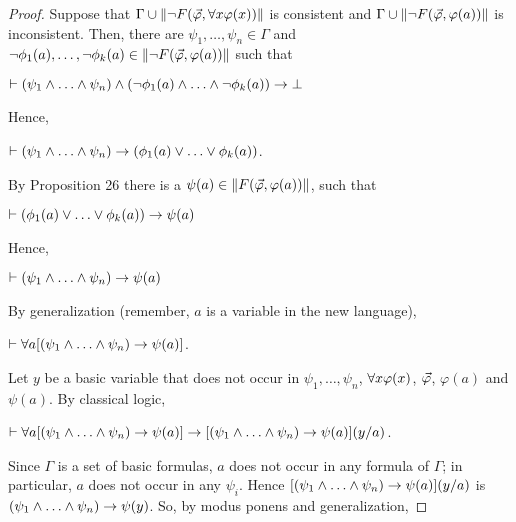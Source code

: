 \begin{proof} 
	Suppose that  $\Gamma \cup \Arrowvert \neg F(\vec{\varphi},\forall x\varphi(x)) \Arrowvert$ is consistent and $\Gamma \cup \Arrowvert \neg F(\vec{\varphi},\varphi(a)) \Arrowvert$ is inconsistent.  Then, there are $\psi_{1}, \dots, \psi_{n} \in \Gamma$ and $\neg \phi_{1}(a), \dots, \neg \phi_{k}(a) \in \Arrowvert \neg F(\vec{\varphi},\varphi(a)) \Arrowvert$ such that
	
	
	
	\begin{center}
		$\teo(\psi_{1} \e \dots \e \psi_{n}) \e (\nao \phi_{1}(a) \e \dots \e \nao \phi_{k}(a)) \impli \bot$
	\end{center} 
Hence,
	
	
	\begin{center}
		$\teo(\psi_{1} \e \dots \e \psi_{n}) \impli (\phi_{1}(a) \ou \dots \ou \phi_{k}(a))$.
	\end{center} 
	
	
\qquad By Proposition 26 there is a $\psi(a) \in \Arrowvert F(\vec{\varphi},\varphi(a)) \Arrowvert$, such that
	
	\begin{center}
		$\teo (\phi_{1}(a) \ou \dots \ou \phi_{k}(a)) \impli \psi(a)$
	\end{center} 
Hence,
	
	
	\begin{center}
		$\teo (\psi_{1} \e \dots \e \psi_{n}) \impli \psi(a)$
	\end{center}
By generalization (remember, $a$ is a variable in the new language),
	
	\begin{center}
		$\teo \todo a [(\psi_{1} \e \dots \e \psi_{n}) \impli \psi(a)]$.
	\end{center}
	
\qquad Let $y$ be a basic variable that does not occur in $\psi_{1}, \dots,\psi_{n}$, $\forall x \varphi (x)$, $\vec{\varphi}$, $\varphi (a)$ and $\psi(a)$. By classical logic,  
	
	
	
	\begin{center}
		$\teo \todo a [(\psi_{1} \e \dots \e \psi_{n}) \impli \psi(a)] \impli [(\psi_{1} \e \dots \e \psi_{n}) \impli \psi(a)](y/a)$.
	\end{center}
	
	\qquad Since $\Gamma$ is a set of basic formulas, $a$ does not occur in any formula of $\Gamma$; in particular, $a$ does not occur in any $\psi_{i}$. Hence $[(\psi_{1} \e \dots \e \psi_{n}) \impli \psi(a)](y/a)$ is $(\psi_{1} \e \dots \e \psi_{n}) \impli \psi(y)$. So, by modus ponens and generalization, 
	

\end{proof}
